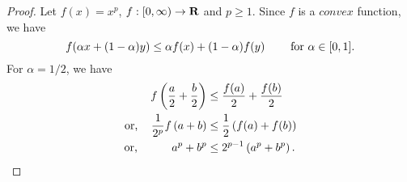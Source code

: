 \begin{proof}
    Let $f(x)=x^p$, $f:[0, \infty)\to \mathbf{R}$ and
    $p\geq 1$. Since $f$ is a $convex$ function, we have
    $$f(\alpha x +(1-\alpha)y)\leq\alpha f(x)+(1-\alpha)
    f(y)\hspace{8mm}\text{for } \alpha\in [0,1].$$
    For $\alpha=1/2$, we have
    \begin{align*}
        f\left(\frac{a}{2}+\frac{b}{2}\right)
        &\leq \frac{f(a)}{2}+\frac{f(b)}{2}\\
        \text{or, }\hspace{3mm}
        \frac{1}{2^p}f\left(a+b\right)
        &\leq \frac{1}{2}\left(f(a)+f(b)\right)\\
        \text{or, }\hspace{9.5mm} a^p +b^p
        &\leq 2^{p-1}\left(a^p+b^p\right).
    \end{align*}
\end{proof}